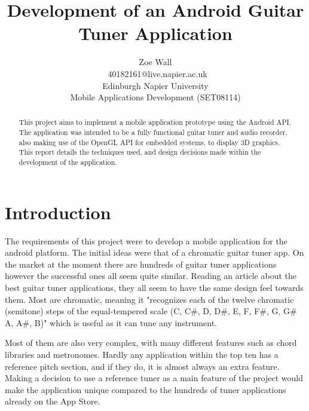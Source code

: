 \documentclass[conference]{acmsiggraph}
\title{Development of an Android Guitar Tuner Application}
\author{Zoe Wall \\\ 40182161@live.napier.ac.uk \\
Edinburgh Napier University \\
Mobile Applications Development (SET08114)}
\begin{document}

\maketitle

\begin{abstract} %
This project aims to implement a mobile application prototype using the Android API. The application was intended to be a fully functional guitar tuner and audio recorder, also making use of the OpenGL API for embedded systems, to display 3D graphics. This report details the techniques used, and design decisions made within the development of the application.
\end{abstract}

\keywordlist

\section{Introduction}

The requirements of this project were to develop a mobile application for the android platform. The initial ideas were that of a chromatic guitar tuner app. On the market at the moment there are hundreds of guitar tuner applications however the successful ones all seem quite similar. Reading an article about the best guitar tuner applications, they all seem to have the same design feel towards them. \cite{bestApps} Most are chromatic, meaning it "recognizes each of the twelve chromatic (semitone) steps of the equal-tempered scale (C, C\#, D, D\#, E, F, F\#, G, G\# A, A\#, B)" which is useful as it can tune any instrument. \cite{Roland}

Most of them are also very complex, with many different features such as chord libraries and metronomes. Hardly any application within the top ten has a reference pitch section, and if they do, it is almost always an extra feature. Making a decision to use a reference tuner as a main feature of the project would make the application unique compared to the hundreds of tuner applications already on the App Store.
\end{document}
